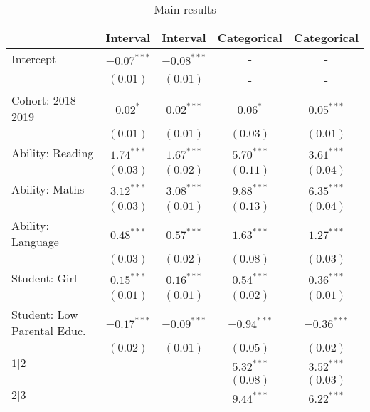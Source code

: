 
\begin{table}
\scriptsize
\caption{Main results}
\label{table: r1}
\begin{center}
\begin{tabular}{l c c c c}
\toprule
\toprule
 & Interval & Interval & Categorical & Categorical \\
\midrule
Intercept                    & $-0.07^{***}$ & $-0.08^{***}$ & - & - \\
                             & $(0.01)$      & $(0.01)$      & - & - \\
Cohort: 2018-2019                 & $0.02^{*}$    & $0.02^{***}$  & $0.06^{*}$    & $0.05^{***}$  \\
                             & $(0.01)$      & $(0.01)$      & $(0.03)$      & $(0.01)$      \\
Ability: Reading                & $1.74^{***}$  & $1.67^{***}$  & $5.70^{***}$  & $3.61^{***}$  \\
                             & $(0.03)$      & $(0.02)$      & $(0.11)$      & $(0.04)$      \\
Ability: Maths                  & $3.12^{***}$  & $3.08^{***}$  & $9.88^{***}$  & $6.35^{***}$  \\
                             & $(0.03)$      & $(0.01)$      & $(0.13)$      & $(0.04)$      \\
Ability: Language               & $0.48^{***}$  & $0.57^{***}$  & $1.63^{***}$  & $1.27^{***}$  \\
                             & $(0.03)$      & $(0.02)$      & $(0.08)$      & $(0.03)$      \\
Student: Girl              & $0.15^{***}$  & $0.16^{***}$  & $0.54^{***}$  & $0.36^{***}$  \\
                             & $(0.01)$      & $(0.01)$      & $(0.02)$      & $(0.01)$      \\
Student: Low Parental Educ.  & $-0.17^{***}$ & $-0.09^{***}$ & $-0.94^{***}$ & $-0.36^{***}$ \\
                             & $(0.02)$      & $(0.01)$      & $(0.05)$      & $(0.02)$      \\
\midrule
$1|2$                          &               &               & $5.32^{***}$  & $3.52^{***}$  \\
                             &               &               & $(0.08)$      & $(0.03)$      \\
$2|3$                          &               &               & $9.44^{***}$  & $6.22^{***}$  \\

\end{tabular}
\end{center}
\end{table}
